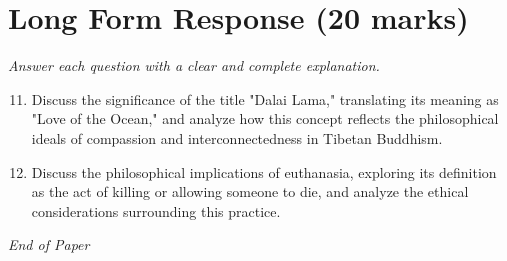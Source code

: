 \documentclass[12pt]{article}
\begin{document}
\section*{Long Form Response (20 marks)}
\textit{Answer each question with a clear and complete explanation.}
\begin{enumerate}[label=\arabic*.]
\setcounter{enumi}{10}
\item Discuss the significance of the title "Dalai Lama," translating its meaning as "Love of the Ocean," and analyze how this concept reflects the philosophical ideals of compassion and interconnectedness in Tibetan Buddhism.
\item Discuss the philosophical implications of euthanasia, exploring its definition as the act of killing or allowing someone to die, and analyze the ethical considerations surrounding this practice.
\end{enumerate}

\vfill
\noindent\textit{End of Paper}
\end{document}
